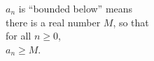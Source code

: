 \documentclass[border=6pt]{standalone}
\begin{document}
\parbox{1.8in}{$a_n$ is ``bounded below'' means \\
\null\quad there is a real number $M$, so that \\
\null\quad for all $n \geq 0$, \\
\null\quad $a_n \geq M$.
}
\end{document}
